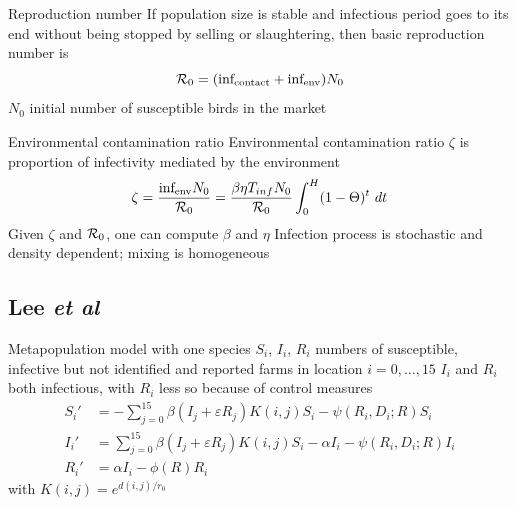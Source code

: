 \documentclass[aspectratio=43]{beamer}
\begin{document}
\begin{frame}{Reproduction number}
	If population size is stable and infectious period goes to its end without being stopped by selling or slaughtering, then basic reproduction number is
	\[
		\mathcal{R}_0=(\text{inf}_\text{contact}+\text{inf}_\text{env})N_0
	\]
	$N_0$ initial number of susceptible birds in the market
\end{frame}

\begin{frame}{Environmental contamination ratio}
	Environmental contamination ratio $\zeta$ is proportion of infectivity mediated by the environment
	\[
		\zeta 
		=\frac{\text{inf}_\text{env}N_0}{\mathcal{R}_0}
		=\frac{\beta\eta T_{inf}N_0}{\mathcal{R}_0}
		\int_0^H(1-\Theta)^t\ dt
	\]
	\vfill
	Given $\zeta$ and $\mathcal{R}_0$, one can compute $\beta$ and $\eta$
	\vfill
	Infection process is stochastic and density dependent; mixing is homogeneous
\end{frame}

\subsection{Lee \emph{et al}}

\begin{frame}{Metapopulation model with one species}
	$S_i$, $I_i$, $R_i$ numbers of susceptible, infective but not identified and reported farms in location $i=0,\ldots,15$
	\vfill
	$I_i$ and $R_i$ both infectious, with $R_i$ less so because of control measures
	\vfill
	\begin{align*}
		S_i' &= -\sum_{j=0}^{15}\beta(I_j+\varepsilon R_j)K(i,j)S_i-\psi(R_i,D_i;R)S_i \\
		I_i' &= \sum_{j=0}^{15}\beta(I_j+\varepsilon R_j)K(i,j)S_i-\alpha I_i-\psi(R_i,D_i;R)I_i \\
		R_i' &= \alpha I_i-\phi(R)R_i
	\end{align*}
	\vfill
	with $K(i,j)=e^{d(i,j)/r_0}$
\end{frame}
\end{document}
